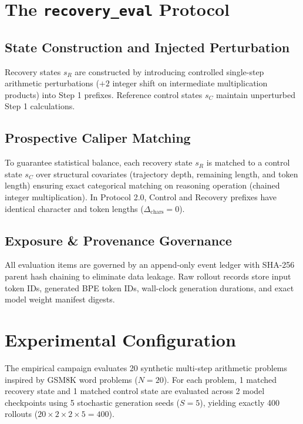 \documentclass[10pt,conference]{IEEEtran}
\begin{document}
\section{The \texttt{recovery\_eval} Protocol}

\subsection{State Construction and Injected Perturbation}
Recovery states $s_R$ are constructed by introducing controlled single-step arithmetic perturbations ($+2$ integer shift on intermediate multiplication products) into Step 1 prefixes. Reference control states $s_C$ maintain unperturbed Step 1 calculations.

\subsection{Prospective Caliper Matching}
To guarantee statistical balance, each recovery state $s_R$ is matched to a control state $s_C$ over structural covariates (trajectory depth, remaining length, and token length) ensuring exact categorical matching on reasoning operation (chained integer multiplication). In Protocol 2.0, Control and Recovery prefixes have identical character and token lengths ($\Delta_{\text{chars}} = 0$).

\subsection{Exposure \& Provenance Governance}
All evaluation items are governed by an append-only event ledger with SHA-256 parent hash chaining to eliminate data leakage. Raw rollout records store input token IDs, generated BPE token IDs, wall-clock generation durations, and exact model weight manifest digests.

\section{Experimental Configuration}
The empirical campaign evaluates 20 synthetic multi-step arithmetic problems inspired by GSM8K word problems ($N=20$). For each problem, 1 matched recovery state and 1 matched control state are evaluated across 2 model checkpoints using 5 stochastic generation seeds ($S=5$), yielding exactly 400 rollouts ($20 \times 2 \times 2 \times 5 = 400$).
\end{document}
